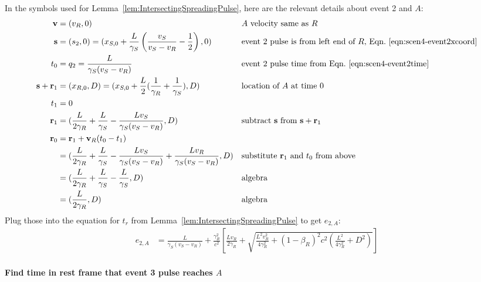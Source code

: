 \documentclass[a4paper]{article}
\theoremstyle{plain}
\theoremstyle{definition}
\newcommand{\vect}[1]{\mathbf{#1}}
\begin{document}
In the symbols used for Lemma~\ref{lem:IntersectingSpreadingPulse},
here are the relevant details about event 2 and $A$:
\begin{align*}
\vect{v} & = (v_R, 0) & & \text{$A$ velocity same as $R$} \\
\vect{s} & = (s_2,0) = (x_{S,0} + \frac{L}{\gamma_S} \left( \frac{v_S}{v_S - v_R} - \frac{1}{2} \right), 0) & & \text{event 2 pulse is from left end of $R$, Eqn.~\eqref{eqn:scen4-event2xcoord}} \\
t_0 & = q_2 = \frac{L}{\gamma_S(v_S - v_R)} & & \text{event 2 pulse time from Eqn.~\eqref{eqn:scen4-event2time}} \\
\vect{s} + \vect{r}_1 & = (x_{R,0}, D) = (x_{S,0} + \frac{L}{2} ( \frac{1}{\gamma_R} + \frac{1}{\gamma_S} ), D) & & \text{location of $A$ at time 0} \\
t_1 & = 0 \\
\vect{r}_1 & = (\frac{L}{2\gamma_R} + \frac{L}{\gamma_S} - \frac{Lv_S}{\gamma_S(v_S-v_R)}, D) & & \text{subtract $\vect{s}$ from $\vect{s}+\vect{r}_1$} \\
\vect{r}_0
  & = \vect{r}_1 + \vect{v}_R(t_0-t_1) \\
  & = (\frac{L}{2\gamma_R} + \frac{L}{\gamma_S} - \frac{Lv_S}{\gamma_S(v_S-v_R)} + \frac{Lv_R}{\gamma_S(v_S - v_R)}, D) & & \text{substitute $\vect{r}_1$ and $t_0$ from above} \\
  & = (\frac{L}{2\gamma_R} + \frac{L}{\gamma_S} - \frac{L}{\gamma_S}, D) & & \text{algebra} \\
  & = (\frac{L}{2\gamma_R}, D) & & \text{algebra}
\end{align*}
Plug those into the equation for $t_r$ from
Lemma~\ref{lem:IntersectingSpreadingPulse} to get $e_{2,A}$:
\begin{align*}
e_{2,A} & = \frac{L}{\gamma_S(v_S - v_R)} + \frac{\gamma_R^2}{c^2} \left[ \frac{Lv_R}{2\gamma_R} + \sqrt{\frac{L^2v_R^2}{4\gamma_R^2} + (1-\beta_R)^2c^2 (\frac{L^2}{4\gamma_R^2} + D^2)} \right]
\end{align*}


\paragraph{Find time in rest frame that event 3 pulse reaches $A$}
\end{document}
